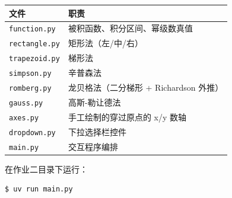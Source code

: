 \documentclass[12pt,a4paper]{ctexart}
\begin{document}
\begin{table}[H]
    \centering
    \begin{tabular}{ll}
        \toprule
        文件 & 职责 \\
        \midrule
        \texttt{function.py}   & 被积函数、积分区间、幂级数真值 \\
        \texttt{rectangle.py}  & 矩形法（左/中/右） \\
        \texttt{trapezoid.py}  & 梯形法 \\
        \texttt{simpson.py}    & 辛普森法 \\
        \texttt{romberg.py}    & 龙贝格法（二分梯形 + Richardson 外推） \\
        \texttt{gauss.py}      & 高斯-勒让德法 \\
        \texttt{axes.py}       & 手工绘制的穿过原点的 x/y 数轴 \\
        \texttt{dropdown.py}   & 下拉选择栏控件 \\
        \texttt{main.py}       & 交互程序编排 \\
        \bottomrule
    \end{tabular}
\end{table}

在作业二目录下运行：

\begin{codebox}
\begin{lstlisting}[style=vscode,language={},numbers=none]
$ uv run main.py
\end{lstlisting}
\end{codebox}
\end{document}
